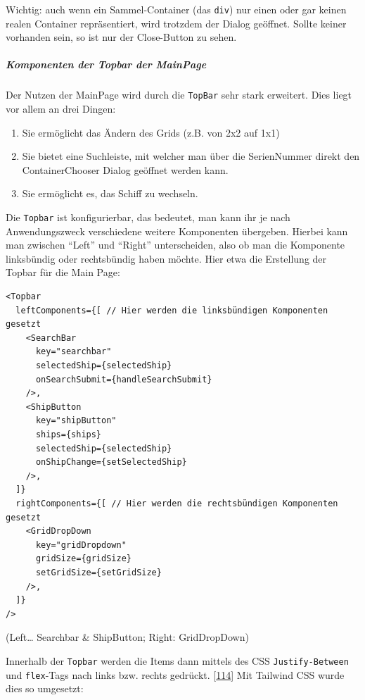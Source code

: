 \documentclass[
    headings=optiontotocandhead,%
    twoside,
    numbers=noenddot,%
    12pt, %
    titlepage, %
    parskip=full, %
    listof=leveldown, 
    numbers=noenddot, %
    a4paper,DIV=14,
    BCOR=15mm,
]{scrbook}
\newcommand{\passthrough}[1]{#1}
\providecommand{\tightlist}{%
  \setlength{\itemsep}{0pt}\setlength{\parskip}{0pt}}
\begin{document}
Wichtig: auch wenn ein Sammel-Container (das
\passthrough{\lstinline!div!}) nur einen oder gar keinen realen
Container repräsentiert, wird trotzdem der Dialog geöffnet. Sollte
keiner vorhanden sein, so ist nur der Close-Button zu sehen.

\hypertarget{komponenten-der-topbar-der-mainpage}{%
\subparagraph{Komponenten der Topbar der
MainPage}\label{komponenten-der-topbar-der-mainpage}}

Der Nutzen der MainPage wird durch die \passthrough{\lstinline!TopBar!}
sehr stark erweitert. Dies liegt vor allem an drei Dingen:

\begin{enumerate}
\def\labelenumi{\arabic{enumi}.}
\tightlist
\item
  Sie ermöglicht das Ändern des Grids (z.B. von 2x2 auf 1x1)
\item
  Sie bietet eine Suchleiste, mit welcher man über die SerienNummer
  direkt den ContainerChooser Dialog geöffnet werden kann.
\item
  Sie ermöglicht es, das Schiff zu wechseln.
\end{enumerate}

Die \passthrough{\lstinline!Topbar!} ist konfigurierbar, das bedeutet,
man kann ihr je nach Anwendungszweck verschiedene weitere Komponenten
übergeben. Hierbei kann man zwischen ``Left'' und ``Right''
unterscheiden, also ob man die Komponente linksbündig oder rechtsbündig
haben möchte. Hier etwa die Erstellung der Topbar für die Main Page:

\begin{lstlisting}[caption={Verschiedene Nutzung der Topbar Komponente in der MainPage}]
<Topbar
  leftComponents={[ // Hier werden die linksbündigen Komponenten gesetzt
    <SearchBar 
      key="searchbar" 
      selectedShip={selectedShip} 
      onSearchSubmit={handleSearchSubmit} 
    />,
    <ShipButton
      key="shipButton"
      ships={ships}
      selectedShip={selectedShip}
      onShipChange={setSelectedShip}
    />,
  ]}
  rightComponents={[ // Hier werden die rechtsbündigen Komponenten gesetzt
    <GridDropDown 
      key="gridDropdown" 
      gridSize={gridSize} 
      setGridSize={setGridSize} 
    />,
  ]}
/>
\end{lstlisting}

(Left\ldots{} Searchbar \& ShipButton; Right: GridDropDown)

Innerhalb der \passthrough{\lstinline!Topbar!} werden die Items dann
mittels des CSS \passthrough{\lstinline!Justify-Between!} und
\passthrough{\lstinline!flex!}-Tags nach links bzw. rechts gedrückt.
{[}\protect\hyperlink{ref-DeveloperMozilla-JustifyContent}{114}{]} Mit
Tailwind CSS wurde dies so umgesetzt:
\end{document}
